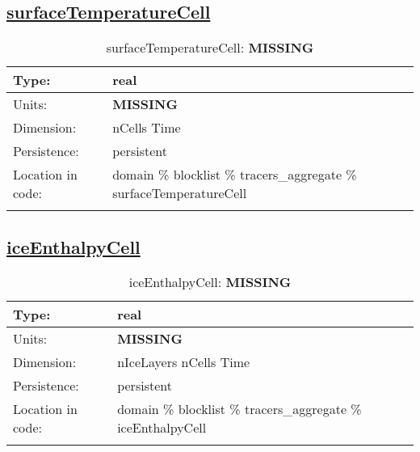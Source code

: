\subsection[surfaceTemperatureCell]{\hyperref[sec:var_tab_tracers_aggregate]{surfaceTemperatureCell}}
\label{subsec:var_sec_tracers_aggregate_surfaceTemperatureCell}
\begin{center}
\begin{longtable}{| p{2.0in} | p{4.0in} |}
        \hline 
        Type: & real \\
        \hline 
        Units: & {\bf \color{red} MISSING} \\
        \hline 
        Dimension: & nCells Time \\
        \hline 
        Persistence: & persistent \\
        \hline 
         Location in code: & domain \% blocklist \% tracers\_aggregate \% surfaceTemperatureCell \\
         \hline 
    \caption{surfaceTemperatureCell: {\bf \color{red} MISSING}}
\end{longtable}
\end{center}
\subsection[iceEnthalpyCell]{\hyperref[sec:var_tab_tracers_aggregate]{iceEnthalpyCell}}
\label{subsec:var_sec_tracers_aggregate_iceEnthalpyCell}
\begin{center}
\begin{longtable}{| p{2.0in} | p{4.0in} |}
        \hline 
        Type: & real \\
        \hline 
        Units: & {\bf \color{red} MISSING} \\
        \hline 
        Dimension: & nIceLayers nCells Time \\
        \hline 
        Persistence: & persistent \\
        \hline 
         Location in code: & domain \% blocklist \% tracers\_aggregate \% iceEnthalpyCell \\
         \hline 
    \caption{iceEnthalpyCell: {\bf \color{red} MISSING}}
\end{longtable}
\end{center}
